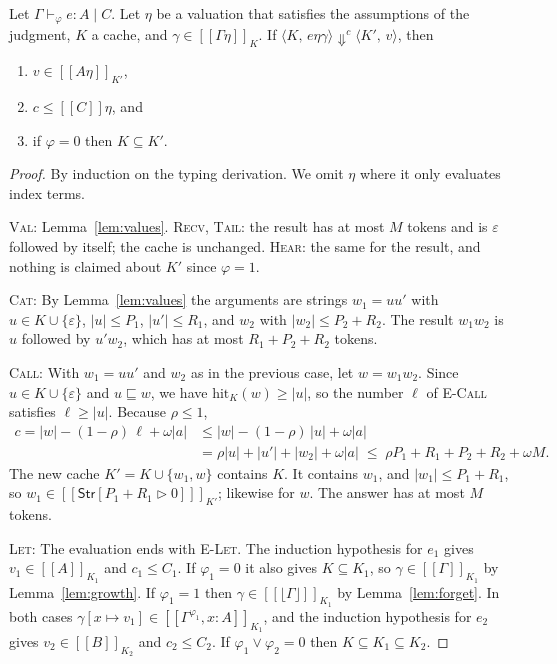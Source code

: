 \documentclass[acmsmall,nonacm,screen]{acmart}
\newcommand{\kw}[1]{\mathsf{#1}}
\newcommand{\Str}[2]{\kw{Str}[#1 \triangleright #2]}
\newcommand{\ev}[5]{\langle #1,\, #2\rangle \Downarrow^{#3} \langle #4,\, #5\rangle}
\newcommand{\sem}[1]{[\![#1]\!]}
\newcommand{\fl}[1]{\lfloor #1 \rfloor}
\newcommand{\hit}{\mathrm{hit}}
\newcommand{\pre}{\sqsubseteq}
\newcommand{\eps}{\varepsilon}
\begin{document}
\begin{theorem}
\label{thm:sound}
Let $\Gamma \vdash_\varphi e : A \mid C$. Let $\eta$ be a valuation that
satisfies the assumptions of the judgment, $K$ a cache, and
$\gamma \in \sem{\Gamma\eta}_K$. If $\ev{K}{e\eta\gamma}{c}{K'}{v}$, then
\begin{enumerate}
\item $v \in \sem{A\eta}_{K'}$,
\item $c \le \sem{C}\eta$, and
\item if $\varphi = 0$ then $K \subseteq K'$.
\end{enumerate}
\end{theorem}

\begin{proof}
By induction on the typing derivation. We omit $\eta$ where it only evaluates index terms.

\textsc{Val}: Lemma~\ref{lem:values}. \textsc{Recv}, \textsc{Tail}: the result has at most $M$
tokens and is $\eps$ followed by itself; the cache is unchanged. \textsc{Hear}: the same for
the result, and nothing is claimed about $K'$ since $\varphi = 1$.

\textsc{Cat}: By Lemma~\ref{lem:values} the arguments are strings $w_1 = uu'$ with
$u \in K \cup \{\eps\}$, $|u| \le P_1$, $|u'| \le R_1$, and $w_2$ with
$|w_2| \le P_2 + R_2$. The result $w_1w_2$ is $u$ followed by $u'w_2$, which has at most
$R_1 + P_2 + R_2$ tokens.

\textsc{Call}: With $w_1 = uu'$ and $w_2$ as in the previous case, let $w = w_1w_2$. Since
$u \in K \cup \{\eps\}$ and $u \pre w$, we have $\hit_K(w) \ge |u|$, so the number $\ell$ of
\textsc{E-Call} satisfies $\ell \ge |u|$. Because $\rho \le 1$,
\begin{align*}
c = |w| - (1-\rho)\,\ell + \omega|a| &\le |w| - (1-\rho)\,|u| + \omega|a| \\
  &= \rho|u| + |u'| + |w_2| + \omega|a| \;\le\; \rho P_1 + R_1 + P_2 + R_2 + \omega M .
\end{align*}
The new cache $K' = K \cup \{w_1, w\}$ contains $K$. It contains $w_1$, and
$|w_1| \le P_1 + R_1$, so $w_1 \in \sem{\Str{P_1+R_1}{0}}_{K'}$; likewise for $w$. The answer
has at most $M$ tokens.

\textsc{Let}: The evaluation ends with \textsc{E-Let}. The induction hypothesis for $e_1$
gives $v_1 \in \sem{A}_{K_1}$ and $c_1 \le C_1$. If $\varphi_1 = 0$ it also gives
$K \subseteq K_1$, so $\gamma \in \sem{\Gamma}_{K_1}$ by Lemma~\ref{lem:growth}. If
$\varphi_1 = 1$ then $\gamma \in \sem{\fl{\Gamma}}_{K_1}$ by Lemma~\ref{lem:forget}. In both
cases $\gamma[x \mapsto v_1] \in \sem{\Gamma^{\varphi_1}, x : A}_{K_1}$, and the induction
hypothesis for $e_2$ gives $v_2 \in \sem{B}_{K_2}$ and $c_2 \le C_2$. If
$\varphi_1 \vee \varphi_2 = 0$ then $K \subseteq K_1 \subseteq K_2$.


\end{proof}
\end{document}
